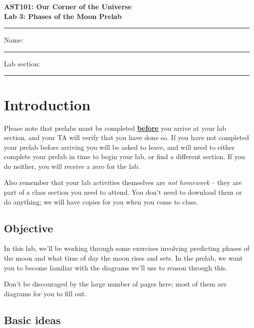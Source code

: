 \documentclass[11pt]{article}
\begin{document}
\begin{center}
\textbf{\Large
AST101: Our Corner of the Universe \\
\vspace*{0.1cm}
Lab 3: Phases of the Moon Prelab
}
\end{center}

\vspace*{0.5cm}

\hrule
{\Large Name:}\vspace*{0.5cm}\\\hrule
{\Large Lab section:}\vspace*{0.5cm}\\\hrule
\vspace*{0.5cm}

\section{Introduction}

Please note that prelabs must be completed \underline{\textbf{before}} you arrive at your lab section, and your TA will verify that you have done so. If you have not completed your prelab before arriving you will be asked to leave, and will need to either complete your prelab in time to begin your lab, or find a different section. If you do neither, you will receive a zero for the lab.

Also remember that your lab activities themselves are {\it not homework} -- they are part of a class section you need to attend. You don't need to download them or do anything; we will have copies for you when you come to class.

\subsection*{Objective}

In this lab, we'll be working through some exercises involving predicting phases of the moon and what time of day the moon 
rises and sets. In the prelab, we want you to become familiar with the diagrams we'll use to reason through this.

Don't be discouraged by the large number of pages here; most of them are diagrams for you to fill out.

\subsection*{Basic ideas}
\end{document}
